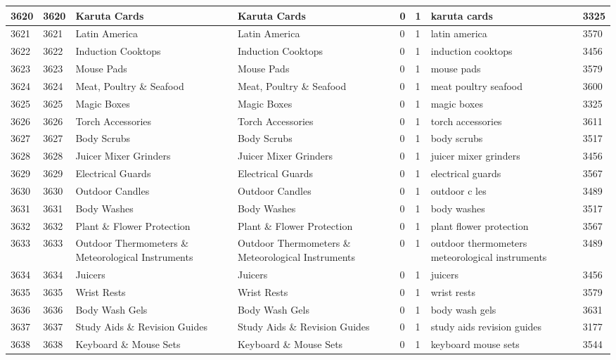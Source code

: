 \begin{longtable}{|l|l|l|l|l|l|l|l|}
3620 & 3620 & Karuta Cards & Karuta Cards & 0 & 1 & karuta cards & 3325 \\ \hline 
3621 & 3621 & Latin America & Latin America & 0 & 1 & latin america & 3570 \\ \hline 
3622 & 3622 & Induction Cooktops & Induction Cooktops & 0 & 1 & induction cooktops & 3456 \\ \hline 
3623 & 3623 & Mouse Pads & Mouse Pads & 0 & 1 & mouse pads & 3579 \\ \hline 
3624 & 3624 & Meat, Poultry \& Seafood & Meat, Poultry \& Seafood & 0 & 1 & meat poultry seafood & 3600 \\ \hline 
3625 & 3625 & Magic Boxes & Magic Boxes & 0 & 1 & magic boxes & 3325 \\ \hline 
3626 & 3626 & Torch Accessories & Torch Accessories & 0 & 1 & torch accessories & 3611 \\ \hline 
3627 & 3627 & Body Scrubs & Body Scrubs & 0 & 1 & body scrubs & 3517 \\ \hline 
3628 & 3628 & Juicer Mixer Grinders & Juicer Mixer Grinders & 0 & 1 & juicer mixer grinders & 3456 \\ \hline 
3629 & 3629 & Electrical Guards & Electrical Guards & 0 & 1 & electrical guards & 3567 \\ \hline 
3630 & 3630 & Outdoor Candles & Outdoor Candles & 0 & 1 & outdoor c les & 3489 \\ \hline 
3631 & 3631 & Body Washes & Body Washes & 0 & 1 & body washes & 3517 \\ \hline 
3632 & 3632 & Plant \& Flower Protection & Plant \& Flower Protection & 0 & 1 & plant flower protection & 3567 \\ \hline 
3633 & 3633 & Outdoor Thermometers \& Meteorological Instruments & Outdoor Thermometers \& Meteorological Instruments & 0 & 1 & outdoor thermometers meteorological instruments & 3489 \\ \hline 
3634 & 3634 & Juicers & Juicers & 0 & 1 & juicers & 3456 \\ \hline 
3635 & 3635 & Wrist Rests & Wrist Rests & 0 & 1 & wrist rests & 3579 \\ \hline 
3636 & 3636 & Body Wash Gels & Body Wash Gels & 0 & 1 & body wash gels & 3631 \\ \hline 
3637 & 3637 & Study Aids \& Revision Guides & Study Aids \& Revision Guides & 0 & 1 & study aids revision guides & 3177 \\ \hline 
3638 & 3638 & Keyboard \& Mouse Sets & Keyboard \& Mouse Sets & 0 & 1 & keyboard mouse sets & 3544 \\ \hline 

\end{longtable}
